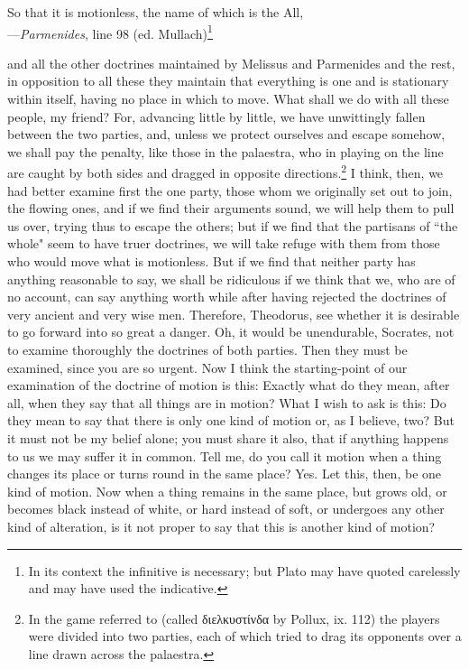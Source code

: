 \documentclass[letterpaper,12pt]{article}
\newcommand{\textgreek}[1]{\begingroup\fontencoding{LGR}\selectfont#1\endgroup}
\newcommand{\stephpag}[1]{\marginnote{\small\itshape\fontfamily{ppl}\selectfont #1}}
\begin{document}
\begin{drama}
\begin{displayquote}So that it is motionless, the name of which is the All,\\
---\emph{Parmenides}, line 98 (ed. Mullach)\footnote{In its context the infinitive is necessary; but Plato may have quoted carelessly and may have used the indicative.}
\end{displayquote}
 and all the other doctrines maintained by Melissus and Parmenides and the rest, in opposition to all these they maintain that everything is one and is stationary within itself, having no place in which to move. What shall we do with all these people, my friend? For, advancing little by little, we have unwittingly fallen between the two parties, and, \stephpag{181 a} unless we protect ourselves and escape somehow, we shall pay the penalty, like those in the palaestra, who in playing on the line are caught by both sides and dragged in opposite directions.\footnote{In the game referred to (called \textgreek{διελκυστίνδα} by Pollux, ix. 112) the players were divided into two parties, each of which tried to drag its opponents over a line drawn across the palaestra.} I think, then, we had better examine first the one party, those whom we originally set out to join, the flowing ones, and if we find their arguments sound, we will help them to pull us over, trying thus to escape the others; but if we find that the partisans of ``the whole" seem to have truer doctrines, we will take refuge with them from those who would move what is motionless. \stephpag{b} But if we find that neither party has anything reasonable to say, we shall be ridiculous if we think that we, who are of no account, can say anything worth while after having rejected the doctrines of very ancient and very wise men. Therefore, Theodorus, see whether it is desirable to go forward into so great a danger.
\theodorusspeaks
Oh, it would be unendurable, Socrates, not to examine thoroughly the doctrines of both parties.
\socratesspeaks
Then they must be examined, since you are so urgent. Now I think the starting-point of our examination of the doctrine of motion is this: \stephpag{c} Exactly what do they mean, after all, when they say that all things are in motion? What I wish to ask is this: Do they mean to say that there is only one kind of motion or, as I believe, two? But it must not be my belief alone; you must share it also, that if anything happens to us we may suffer it in common. Tell me, do you call it motion when a thing changes its place or turns round in the same place?
\theodorusspeaks
Yes.
\socratesspeaks
Let this, then, be one kind of motion. Now when a thing \stephpag{d} remains in the same place, but grows old, or becomes black instead of white, or hard instead of soft, or undergoes any other kind of alteration, is it not proper to say that this is another kind of motion?

\end{drama}
\end{document}
